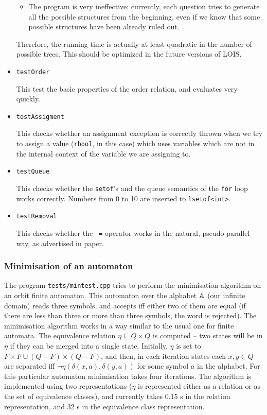 \begin{itemize}
\begin{itemize}
\item The
program is very ineffective: currently, each question tries to generate all the possible
structures from the beginning, even if we know that some possible structures have been
already ruled out.
\end{itemize}

Therefore, the running time is actually at least quadratic in the
number of possible trees. This should be optimized in the future versions of LOIS.

\item \verb-testOrder-

This test the basic properties of the order relation, and evaluates very quickly.

\item \verb-testAssigment-

This checks whether an assignment exception is correctly thrown 
when we try to assign a value
(\verb-rbool-, in this case) which uses variables which are not in the internal
context of the variable we are assigning to.

\item \verb-testQueue-

This checks whether the \verb-setof-'s and the queue semantics of the \verb-for-
loop works correctly. Numbers from 0 to 10 are inserted to \verb-lsetof<int>-.

\item \verb-testRemoval-

This checks whether the \verb|-=| operator works in the natural, pseudo-parallel
way, as advertised in paper.
\end{itemize}

\subsubsection{Minimisation of an automaton}

The program \verb-tests/mintest.cpp- tries to perform the minimisation algorithm
on an orbit finite automaton. This automaton over the alphabet ${\mathbb A}$ (our infinite
domain) reads
three symbols, and accepts iff either two of them are equal (if there are less than
three or more than three symbols, the word is rejected). The minimisation algorithm
works in a way similar to the usual one for finite automata. The equivalence relation $\eta \subseteq Q \times Q$ is computed --
two states will be in $\eta$ if they can be merged into a single state. Initially,
$\eta$ is set to $F \times F \cup (Q-F) \times (Q-F)$, and then, in each iteration
states each $x,y \in Q$ are separated iff $\neg \eta(\delta(x,a), \delta(y,a))$ for some
symbol $a$ in the alphabet. For this particular automaton minimisation takes four
iterations. The algorithm is implemented using two representations ($\eta$ is
represented either as a relation or as the set of equivalence classes), and currently
takes 0.15 s in the relation representation, and 32 s in the equivalence class representation.

